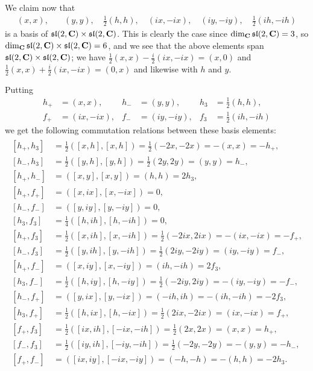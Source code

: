 We claim now that
\begin{align*}
  (x,x),& \quad (y,y), \quad \tfrac{1}{2}(h,h), \quad (ix,-ix), \quad (iy,-iy), \quad \tfrac{1}{2}(ih,-ih)
\end{align*}
is a basis of $\mathfrak{sl}(2,\mathbf{C})\times \mathfrak{sl}(2,\mathbf{C})$. This is clearly the case since $\dim_{\mathbf{C}} \mathfrak{sl}(2,\mathbf{C}) = 3$, so $\dim_{\mathbf{C}} \mathfrak{sl}(2,\mathbf{C})\times \mathfrak{sl}(2,\mathbf{C}) = 6$, and we see that the above elements span $\mathfrak{sl}(2,\mathbf{C})\times \mathfrak{sl}(2,\mathbf{C})$; we have $\tfrac{1}{2}(x,x)-\tfrac{i}{2}(ix,-ix)=(x,0)$ and $\tfrac{1}{2}(x,x)+\tfrac{i}{2}(ix,-ix)=(0,x)$ and likewise with $h$ and $y$. 

Putting
\begin{align*}
  h_+&=(x,x), & h_-&=(y,y), & h_3&=\tfrac{1}{2}(h,h), \\
  f_+&=(ix,-ix), & f_-&=(iy,-iy),&  f_3&=\tfrac{1}{2}(ih,-ih)
\end{align*}
we get the following commutation relations between these basis elements:
\begin{align}
  \begin{split}
    [h_+,h_3] &= \tfrac{1}{2}([x,h],[x,h]) = \tfrac{1}{2}(-2x,-2x) = -(x,x) = -h_+, \label{eq:lierels} \\
    [h_-,h_3] &= \tfrac{1}{2}([y,h],[y,h]) = \tfrac{1}{2}(2y,2y) = (y,y) = h_-, \\
    [h_+,h_-] &= ([x,y],[x,y]) = (h,h) = 2h_3, \\
    [h_+,f_+] &= ([x,ix],[x,-ix]) = 0, \\
    [h_-,f_-] &= ([y,iy],[y,-iy]) = 0, \\
    [h_3,f_3] &= \tfrac{1}{4}([h,ih],[h,-ih]) = 0, \\
    [h_+,f_3] &= \tfrac{1}{2}([x,ih],[x,-ih]) = \tfrac{1}{2}(-2ix,2ix) = -(ix,-ix) = -f_+, \\
    [h_-,f_3] &= \tfrac{1}{2}([y,ih],[y,-ih]) = \tfrac{1}{2}(2iy,-2iy) = (iy,-iy) = f_-, \\
    [h_+,f_-] &= ([x,iy],[x,-iy]) = (ih,-ih) = 2f_3, \\
    [h_3,f_-] &= \tfrac{1}{2}([h,iy],[h,-iy]) = \tfrac{1}{2}(-2iy,2iy) = -(iy,-iy) = -f_-, \\
    [h_-,f_+] &= ([y,ix],[y,-ix]) = (-ih,ih) = -(ih,-ih) = -2f_3, \\
    [h_3,f_+] &= \tfrac{1}{2}([h,ix],[h,-ix]) = \tfrac{1}{2}(2ix,-2ix) = (ix,-ix) = f_+, \\
    [f_+,f_3] &= \tfrac{1}{2}([ix,ih],[-ix,-ih]) = \tfrac{1}{2}(2x,2x) = (x,x) = h_+, \\
    [f_-,f_3] &= \tfrac{1}{2}([iy,ih],[-iy,-ih]) = \tfrac{1}{2}(-2y,-2y) = -(y,y) = -h_-, \\
    [f_+,f_-] &= ([ix,iy],[-ix,-iy]) = (-h,-h) = -(h,h) = -2h_3.
  \end{split}
\end{align}

